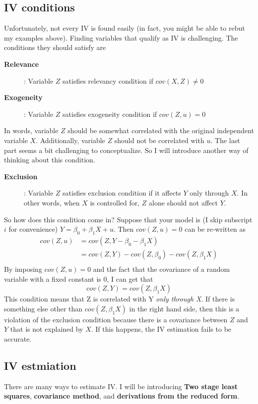 \documentclass[12pt]{article}
\theoremstyle{definition}
\theoremstyle{property}
\theoremstyle{assumption}
\theoremstyle{example}
\theoremstyle{comment}
\begin{document}
\subsection{IV conditions}
Unfortunately, not every IV is found easily (in fact, you might be able to rebut my examples above). Finding variables that qualify as IV is challenging. The conditions they should satisfy are
\begin{description}
\item[\textbf{Relevance}]: Variable $Z$ satisfies relevancy condition if $cov(X,Z)\neq0$
\item[\textbf{Exogeneity}]: Variable $Z$ satisfies exogeneity condition if $cov(Z,u)=0$
\end{description}
In words, variable $Z$ should be somewhat correlated with the original independent variable $X$. Additionally, variable $Z$ should not be correlated with $u$. The last part seems a bit challenging to conceptualize. So I will introduce another way of thinking about this condition.
\begin{description}
\item[\textbf{Exclusion}]: Variable $Z$ satisfies exclusion condition if it affects $Y$ only through $X$. In other words, when $X$ is controlled for, $Z$ alone should not affect $Y$.
\end{description}
So how does this condition come in? Suppose that your model is (I skip subscript $i$ for convenience) $Y=\beta_0+\beta_1X+u$. Then $cov(Z,u)=0$ can be re-written as
\[
\begin{aligned}
cov(Z,u)&=cov(Z,Y-\beta_0-\beta_1X)\\
&=cov(Z,Y)-cov(Z,\beta_0)-cov(Z,\beta_1X)\\
\end{aligned}
\]
By imposing $cov(Z,u)=0$ and the fact that the covariance of a random variable with a fixed constant is 0, I can get that
\[
cov(Z,Y)=cov(Z,\beta_1X)
\]
This condition means that Z is correlated with Y \textit{only through X}. If there is something else other than $cov(Z,\beta_1X)$ in the right hand side, then this is a violation of the exclusion condition because there is a covariance between $Z$ and $Y$ that is not explained by $X$. If this happens, the IV estimation fails to be accurate. 

\subsection{IV estmiation}
There are many ways to estimate IV. I will be introducing \textbf{Two stage least squares}, \textbf{covariance method}, and \textbf{derivations from the reduced form}. 
\end{document}
